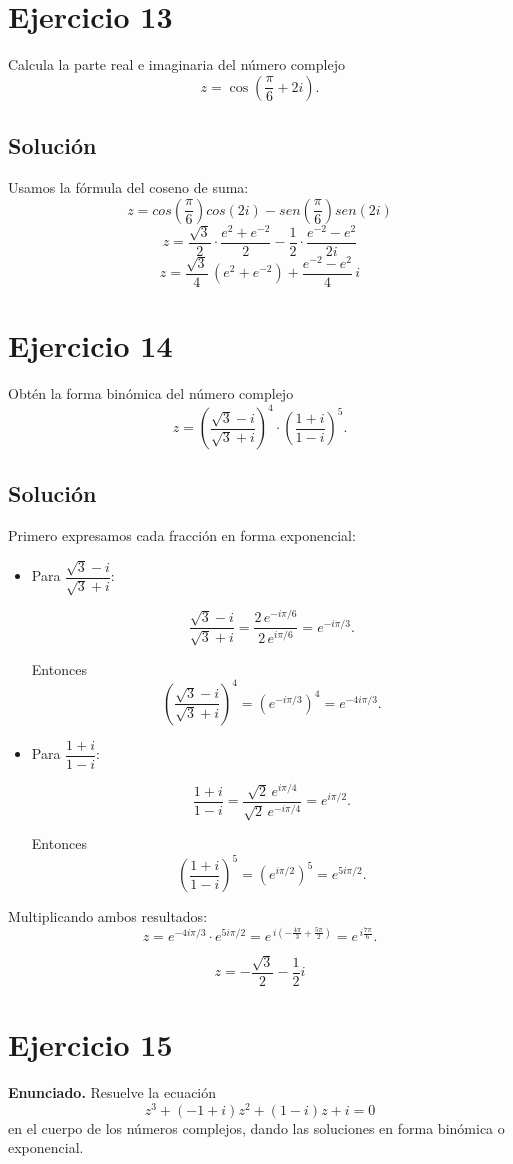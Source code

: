 \documentclass[fleqn]{article}
\begin{document}
\section*{Ejercicio 13}
Calcula la parte real e imaginaria del número complejo
\[
z=\cos\!\left(\frac{\pi}{6}+2i\right).
\]
\subsection*{Solución}
Usamos la fórmula del coseno de suma:
\[
z= cos(\frac{\pi}{6}) cos(2i)- sen(\frac{\pi}{6})sen(2i)
\]
\[
z =\frac{\sqrt{3}}{2}\cdot\frac{e^{2}+e^{-2}}{2}
-\frac{1}{2}\cdot\frac{e^{-2}-e^{2}}{2i}
\]
\[
\boxed{\,z=\frac{\sqrt{3}}{4}\,(e^{2}+e^{-2})+\frac{e^{-2}-e^{2}}{4}\,i\,}
\]
\section*{Ejercicio 14}
Obtén la forma binómica del número complejo
\[
z=\left(\frac{\sqrt{3}-i}{\sqrt{3}+i}\right)^{4}\cdot\left(\frac{1+i}{1-i}\right)^{5}.
\]

\subsection*{Solución}
Primero expresamos cada fracción en forma exponencial:

\begin{itemize}
\item Para $\dfrac{\sqrt{3}-i}{\sqrt{3}+i}$:

\[
\frac{\sqrt{3}-i}{\sqrt{3}+i}
=\frac{2\,e^{-i\pi/6}}{2\,e^{i\pi/6}}
=e^{-i\pi/3}.
\]

Entonces
\[
\left(\frac{\sqrt{3}-i}{\sqrt{3}+i}\right)^{4}
=\left(e^{-i\pi/3}\right)^4
=e^{-4i\pi/3}.
\]

\item Para $\dfrac{1+i}{1-i}$:

\[
\frac{1+i}{1-i}
=\frac{\sqrt{2}\,e^{i\pi/4}}{\sqrt{2}\,e^{-i\pi/4}}
=e^{i\pi/2}.
\]

Entonces
\[
\left(\frac{1+i}{1-i}\right)^{5}
=\left(e^{i\pi/2}\right)^5
=e^{5i\pi/2}.
\]
\end{itemize}

Multiplicando ambos resultados:
\[
z=e^{-4i\pi/3}\cdot e^{5i\pi/2}
=e^{\,i\left(-\tfrac{4\pi}{3}+\tfrac{5\pi}{2}\right)}
=e^{\,i\frac{7\pi}{6}}.
\]

\[
\boxed{\,z=-\frac{\sqrt{3}}{2}-\frac{1}{2}i\,}
\]
\section*{Ejercicio 15}
\textbf{Enunciado.} Resuelve la ecuación
\[
z^3+(-1+i)z^2+(1-i)z+i=0
\]
en el cuerpo de los números complejos, dando las soluciones en forma binómica o exponencial.
\end{document}
